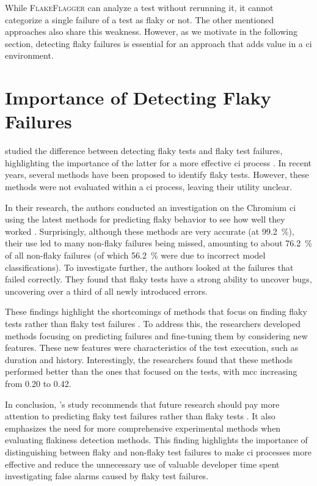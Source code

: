 While \textsc{FlakeFlagger} can analyze a test without rerunning it, it cannot categorize a single failure of a test as flaky or not.
The other mentioned approaches also share this weakness.
However, as we motivate in the following section, detecting flaky failures is essential for an approach that adds value in a \ac{ci} environment.

\section{Importance of Detecting Flaky Failures}
 studied the difference between detecting flaky tests and flaky test failures, highlighting the importance of the latter for a more effective \ac{ci} process \autocite{haben_importance_2023}.
In recent years, several methods have been proposed to identify flaky tests.
However, these methods were not evaluated within a \ac{ci} process, leaving their utility unclear.

In their research, the authors conducted an investigation on the Chromium \ac{ci} using the latest methods for predicting flaky behavior to see how well they worked \autocite{haben_importance_2023}. 
Surprisingly, although these methods are very accurate (at \SI{99.2}{\percent}), their use led to many non-flaky failures being missed, amounting to about \SI{76.2}{\percent} of all non-flaky failures (of which \SI{56.2}{\percent} were due to incorrect model classifications).
To investigate further, the authors looked at the failures that failed correctly. 
They found that flaky tests have a strong ability to uncover bugs, uncovering over a third of all newly introduced errors.

These findings highlight the shortcomings of methods that focus on finding flaky tests rather than flaky test failures \autocite{haben_importance_2023}. 
To address this, the researchers developed methods focusing on predicting failures and fine-tuning them by considering new features. 
These new features were characteristics of the test execution, such as duration and history. 
Interestingly, the researchers found that these methods performed better than the ones that focused on the tests, with \ac{mcc} increasing from \num{0.20} to \num{0.42}.

In conclusion, \citeauthor*{haben_importance_2023}'s study recommends that future research should pay more attention to predicting flaky test failures rather than flaky tests \autocite{haben_importance_2023}. 
It also emphasizes the need for more comprehensive experimental methods when evaluating flakiness detection methods. 
This finding highlights the importance of distinguishing between flaky and non-flaky test failures to make \ac{ci} processes more effective and reduce the unnecessary use of valuable developer time spent investigating false alarms caused by flaky test failures.

